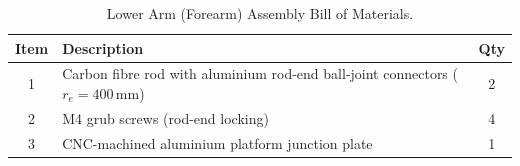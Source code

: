 \begin{table}[ht]
    \centering
    \caption{Lower Arm (Forearm) Assembly Bill of Materials.}
    \label{tab:lower_arm_components}
    {\small
    \begin{tabular}{clc}
        \hline
        \textbf{Item} & \textbf{Description} & \textbf{Qty} \\
        \hline
        1 & Carbon fibre rod with aluminium rod-end
            ball-joint connectors ($r_e = 400$\,mm) & 2 \\
        2 & M4 grub screws (rod-end locking)         & 4 \\
        3 & CNC-machined aluminium platform
            junction plate                           & 1 \\
        \hline
    \end{tabular}}
\end{table}

